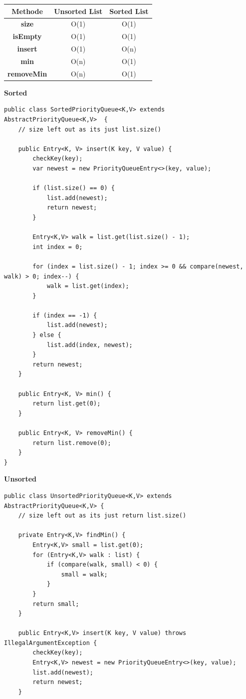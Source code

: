 \begin{multicols*}{4}
		\begin{tabular}{c | c | c}
			\textbf{Methode} & \textbf{Unsorted List} & \textbf{Sorted List} \\
			\hline
			\textbf{size} & O(1) & O(1) \\
			\textbf{isEmpty} & O(1) & O(1) \\
			\textbf{insert} & O(1) & O(n) \\
			\textbf{min} & O(n) & O(1) \\
			\textbf{removeMin} & O(n) & O(1) \\
		\end{tabular}
	
	\vspace{3pt}
	\textbf{Sorted}
	\begin{lstlisting}
public class SortedPriorityQueue<K,V> extends AbstractPriorityQueue<K,V>  {
	// size left out as its just list.size()
	
	public Entry<K, V> insert(K key, V value) {		
		checkKey(key);
		var newest = new PriorityQueueEntry<>(key, value);
		
		if (list.size() == 0) {
			list.add(newest);
			return newest;
		}
		
		Entry<K,V> walk = list.get(list.size() - 1);
		int index = 0;
		
		for (index = list.size() - 1; index >= 0 && compare(newest, walk) > 0; index--) {
			walk = list.get(index);	
		}
		
		if (index == -1) {
			list.add(newest);
		} else {
			list.add(index, newest);
		}
		return newest;
	}
	
	public Entry<K, V> min() {
		return list.get(0);
	}
	
	public Entry<K, V> removeMin() {
		return list.remove(0);
	}
}
	\end{lstlisting}

\columnbreak
\textbf{Unsorted}
	\begin{lstlisting}
public class UnsortedPriorityQueue<K,V> extends AbstractPriorityQueue<K,V> {
	// size left out as its just return list.size()
	
	private Entry<K,V> findMin() {
		Entry<K,V> small = list.get(0);
		for (Entry<K,V> walk : list) {
			if (compare(walk, small) < 0) {
				small = walk;
			}
		}
		return small;
	}
	
	public Entry<K,V> insert(K key, V value) throws IllegalArgumentException {
		checkKey(key);
		Entry<K,V> newest = new PriorityQueueEntry<>(key, value);
		list.add(newest);
		return newest;
	}


\end{lstlisting}
\end{multicols*}
